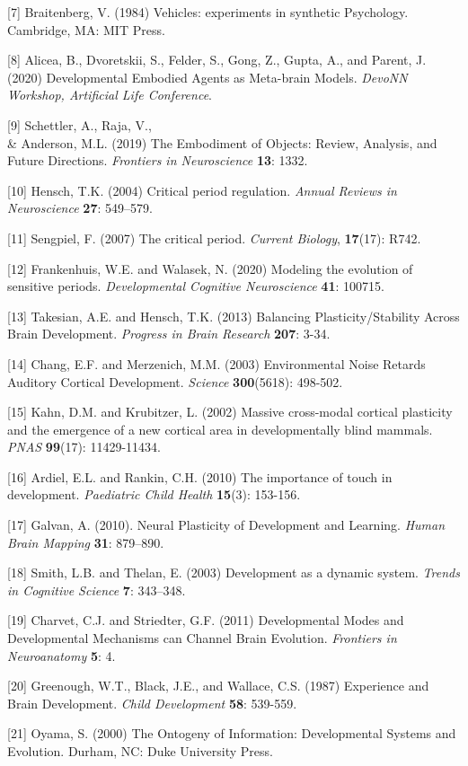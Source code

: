 \documentclass{article}
\begin{document}
[7] Braitenberg, V. (1984) Vehicles: experiments in synthetic Psychology. Cambridge, MA: MIT Press.

[8] Alicea, B., Dvoretskii, S., Felder, S., Gong, Z., Gupta, A., and Parent, J. (2020) Developmental Embodied Agents as Meta-brain Models. {\it DevoNN Workshop, Artificial Life Conference}.

[9] Schettler, A., Raja, V., \\& Anderson, M.L. (2019) The Embodiment of Objects: Review, Analysis, and Future Directions. {\it Frontiers in Neuroscience} {\bf 13}: 1332.

[10] Hensch, T.K. (2004)  Critical period regulation. {\it Annual Reviews in Neuroscience} {\bf 27}: 549–579.

[11] Sengpiel, F. (2007) The critical period. {\it Current Biology}, {\bf 17}(17): R742.

[12] Frankenhuis, W.E. and Walasek, N. (2020) Modeling the evolution of sensitive periods. {\it Developmental Cognitive Neuroscience} {\bf 41}: 100715.

[13] Takesian, A.E. and Hensch, T.K. (2013) Balancing Plasticity/Stability Across Brain Development. {\it Progress in Brain Research} {\bf 207}: 3-34.

[14] Chang, E.F. and Merzenich, M.M. (2003) Environmental Noise Retards Auditory Cortical Development. {\it Science} {\bf 300}(5618): 498-502.

[15] Kahn, D.M. and Krubitzer, L. (2002) Massive cross-modal cortical plasticity and the emergence of a new cortical area in developmentally blind mammals. {\it PNAS} {\bf 99}(17): 11429-11434.

[16] Ardiel, E.L. and Rankin, C.H. (2010) The importance of touch in development. {\it Paediatric Child Health} {\bf 15}(3): 153-156.

[17] Galvan, A. (2010). Neural Plasticity of Development and Learning. {\it Human Brain Mapping} {\bf 31}: 879–890.

[18] Smith, L.B. and Thelan, E. (2003) Development as a dynamic system. {\it Trends in Cognitive Science} {\bf 7}: 343–348.

[19] Charvet, C.J. and Striedter, G.F. (2011) Developmental Modes and Developmental Mechanisms can Channel Brain Evolution. {\it Frontiers in Neuroanatomy} {\bf 5}: 4.

[20] Greenough, W.T., Black, J.E., and Wallace, C.S. (1987) Experience and Brain Development. {\it Child Development} {\bf 58}: 539-559.

[21] Oyama, S. (2000) The Ontogeny of Information: Developmental Systems and Evolution. Durham, NC: Duke University Press.
\end{document}
